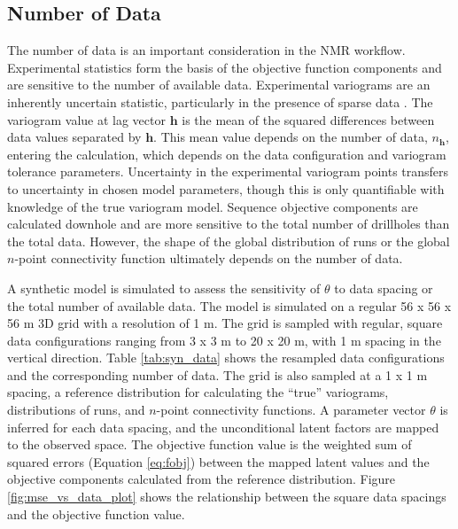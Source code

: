 \subsection{Number of Data}
\label{subsec:04ndata}

The number of data is an important consideration in the \gls{NMR} workflow. Experimental statistics form the basis of the objective function components and are sensitive to the number of available data. Experimental variograms are an inherently uncertain statistic, particularly in the presence of sparse data \citep{ortiz2002calculation,pardo-iguzquiza2012varboot}. The variogram value at lag vector $\mathbf{h}$ is the mean of the squared differences between data values separated by $\mathbf{h}$. This mean value depends on the number of data, $n_{\mathbf{h}}$, entering the calculation, which depends on the data configuration and variogram tolerance parameters. Uncertainty in the experimental variogram points transfers to uncertainty in chosen model parameters, though this is only quantifiable with knowledge of the true variogram model. Sequence objective components are calculated downhole and are more sensitive to the total number of drillholes than the total data. However, the shape of the global distribution of runs or the global $n$-point connectivity function ultimately depends on the number of data.

A synthetic model is simulated to assess the sensitivity of $\theta$ to data spacing or the total number of available data. The model is simulated on a regular 56 x 56 x 56 m \gls{3D} grid with a resolution of 1 m. The grid is sampled with regular, square data configurations ranging from 3 x 3 m to 20 x 20 m, with 1 m spacing in the vertical direction. Table \ref{tab:syn_data} shows the resampled data configurations and the corresponding number of data. The grid is also sampled at a 1 x 1 m spacing, a reference distribution for calculating the ``true'' variograms, distributions of runs, and $n$-point connectivity functions. A parameter vector $\theta$ is inferred for each data spacing, and the unconditional latent factors are mapped to the observed space. The objective function value is the weighted sum of squared errors (Equation \ref{eq:fobj}) between the mapped latent values and the objective components calculated from the reference distribution. Figure \ref{fig:mse_vs_data_plot} shows the relationship between the square data spacings and the objective function value.

